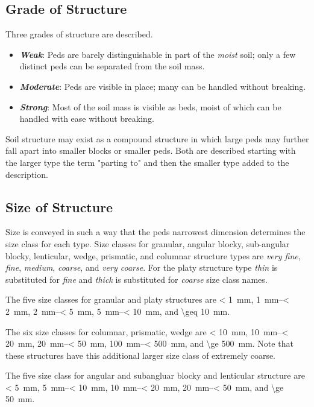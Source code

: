 \documentclass{book}
\begin{document}
\subsection{Grade of Structure}
    
Three grades of structure are described.

\begin{itemize}
    \item \textbf{\emph{Weak}}: Peds are barely distinguishable in part of the \emph{moist} soil; only a few distinct peds can be separated from the soil mass.
    \item \textbf{\emph{Moderate}}: Peds are visible in place; many can be handled without breaking.
    \item \textbf{\emph{Strong}}: Most of the soil mass is visible as beds, moist of which can be handled with ease without breaking.
\end{itemize}

Soil structure may exist as a compound structure in which large peds may further fall apart into smaller blocks or smaller peds. Both are described starting with the larger type the term "parting to" and then the smaller type added to the description.
    
\subsection{Size of Structure}
    
Size is conveyed in such a way that the peds narrowest dimension  determines the size class for each type. Size classes for granular, angular blocky, sub-angular blocky, lenticular, wedge, prismatic, and columnar structure types are \emph{very fine}, \emph{fine}, \emph{medium}, \emph{coarse}, and \emph{very coarse}. For the platy structure type \emph{thin} is substituted for \emph{fine} and \emph{thick} is substituted for \emph{coarse} size class names.

The five size classes for granular and platy structures are \qty{< 1}{mm}, \qtyrange{1}{< 2}{mm}, \qtyrange{2}{< 5}{mm}, \qtyrange{5}{< 10}{mm}, and \qty{\geq 10}{mm}.

The six size classes for columnar, prismatic, wedge are \qty{< 10}{mm}, \qtyrange{10}{< 20}{mm}, \qtyrange{20}{< 50}{mm}, \qtyrange{100}{< 500}{mm}, and \qty{\ge 500}{mm}. Note that these structures have this additional larger size class of extremely coarse.

The five size class for angular and subangluar blocky and lenticular structure are \qty{< 5}{mm}, \qtyrange{5}{< 10}{mm}, \qtyrange{10}{< 20}{mm}, \qtyrange{20}{< 50}{mm}, and \qty{\ge 50}{mm}.
\end{document}
